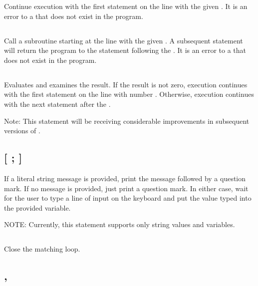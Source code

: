 \documentclass{report}
\begin{document}
    Continue execution with the first statement on the line with the given .
    It is an error to  a  that does not exist in the program.

    \subsection*{ }

    Call a subroutine starting at the line with the given .
    A subsequent  statement will return the program to the statement
    following the .
    It is an error to  a  that does not exist in the program.

    \subsection*{   }

    Evaluates  and examines the result.
    If the result is not zero, execution continues with the first statement on the line with number .
    Otherwise, execution continues with the next statement after the .

    Note: This statement will be receiving considerable improvements in subsequent versions of \BASIC.

    \subsection*{ [ ; ] }

    If a literal string message is provided, print the message followed by a question mark.
    If no message is provided, just print a question mark.
    In either case, wait for the user to type a line of input on the keyboard and
    put the value typed into the provided variable.

    NOTE: Currently, this statement supports only string values and variables.

    \subsection*{}

    Close the matching  loop.

    \subsection*{ , }
\end{document}
